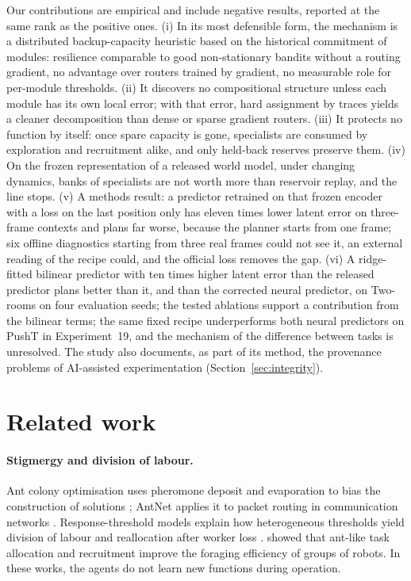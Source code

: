 \documentclass[11pt,a4paper]{article}
\begin{document}
Our contributions are empirical and include negative results, reported at the same rank as the positive ones. (i) In its most defensible form, the mechanism is a distributed backup-capacity heuristic based on the historical commitment of modules: resilience comparable to good non-stationary bandits without a routing gradient, no advantage over routers trained by gradient, no measurable role for per-module thresholds. (ii) It discovers no compositional structure unless each module has its own local error; with that error, hard assignment by traces yields a cleaner decomposition than dense or sparse gradient routers. (iii) It protects no function by itself: once spare capacity is gone, specialists are consumed by exploration and recruitment alike, and only held-back reserves preserve them. (iv) On the frozen representation of a released world model, under changing dynamics, banks of specialists are not worth more than reservoir replay, and the line stops. (v) A methods result: a predictor retrained on that frozen encoder with a loss on the last position only has eleven times lower latent error on three-frame contexts and plans far worse, because the planner starts from one frame; six offline diagnostics starting from three real frames could not see it, an external reading of the recipe could, and the official loss removes the gap. (vi) A ridge-fitted bilinear predictor with ten times higher latent error than the released predictor plans better than it, and than the corrected neural predictor, on Two-rooms on four evaluation seeds; the tested ablations support a contribution from the bilinear terms; the same fixed recipe underperforms both neural predictors on PushT in Experiment~19, and the mechanism of the difference between tasks is unresolved. The study also documents, as part of its method, the provenance problems of AI-assisted experimentation (Section~\ref{sec:integrity}).

\section{Related work}

\paragraph{Stigmergy and division of labour.} Ant colony optimisation uses pheromone deposit and evaporation to bias the construction of solutions \citep{dorigo1996antsystem}; AntNet applies it to packet routing in communication networks \citep{dicaro1998antnet}. Response-threshold models explain how heterogeneous thresholds yield division of labour and reallocation after worker loss \citep{bonabeau1996threshold,theraulaz1998reinforcement}. \citet{krieger2000robots} showed that ant-like task allocation and recruitment improve the foraging efficiency of groups of robots. In these works, the agents do not learn new functions during operation.
\end{document}
